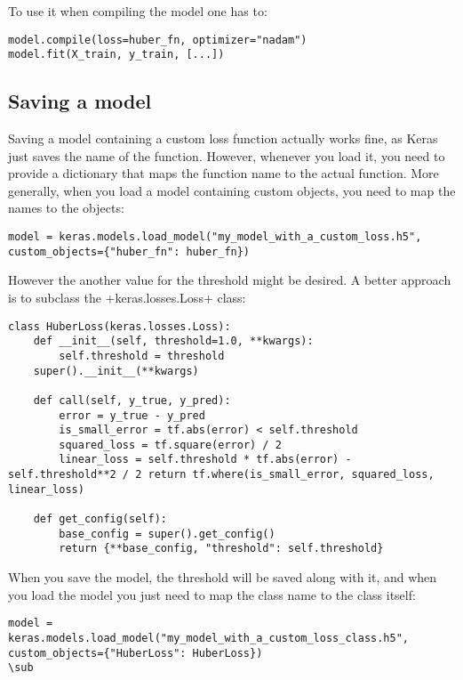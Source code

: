 To use it when compiling the model one has to:
\begin{lstlisting}
model.compile(loss=huber_fn, optimizer="nadam")
model.fit(X_train, y_train, [...])
\end{lstlisting}
\subsection{Saving a model}
Saving a model containing a custom loss function actually works fine, as Keras just saves the name of the function. However, whenever you load it, you need to provide a dictionary that maps the function name to the actual function. More generally, when you load a model containing custom objects, you need to map the names to the objects:
\begin{lstlisting}
model = keras.models.load_model("my_model_with_a_custom_loss.h5", custom_objects={"huber_fn": huber_fn})
\end{lstlisting}
However the another value for the threshold might be desired. A better approach is to subclass the \cd+keras.losses.Loss+ class:
\begin{lstlisting}
class HuberLoss(keras.losses.Loss):
	def __init__(self, threshold=1.0, **kwargs):
    	self.threshold = threshold
	super().__init__(**kwargs) 
	
	def call(self, y_true, y_pred):
		error = y_true - y_pred
		is_small_error = tf.abs(error) < self.threshold
		squared_loss = tf.square(error) / 2
		linear_loss = self.threshold * tf.abs(error) - self.threshold**2 / 2 return tf.where(is_small_error, squared_loss, linear_loss)
	
	def get_config(self):
		base_config = super().get_config()
		return {**base_config, "threshold": self.threshold}
\end{lstlisting}
When you save the model, the threshold will be saved along with it, and when you load the model you just need to map the class name to the class itself:
\begin{lstlisting}
model = keras.models.load_model("my_model_with_a_custom_loss_class.h5", custom_objects={"HuberLoss": HuberLoss})
\sub
\end{lstlisting}
